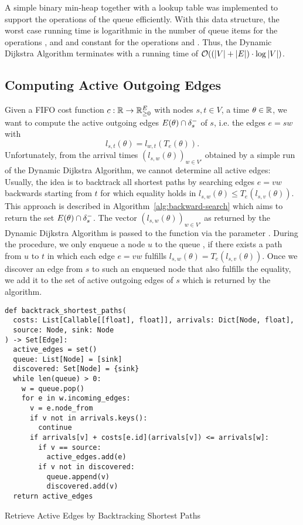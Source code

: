 A simple binary min-heap together with a lookup table was implemented to support the operations of the queue efficiently.
With this data structure, the worst case running time is logarithmic in the number of queue items for the operations ,  and  and constant for the operations  and .
Thus, the Dynamic Dijkstra Algorithm terminates with a running time of $\mathcal{O}( (\left| V \right| + \left| E \right|) \cdot \log \left| V \right|)$.


\subsection{Computing Active Outgoing Edges}\label{sec:compute-active-edges}

Given a FIFO cost function $c: \mathbb{R}\rightarrow\mathbb{R}_{\geq0}^E$ with nodes $s,t\in V$, a time $\theta\in\mathbb{R}$, we want to compute the active outgoing edges $E(\theta) \cap \delta^-_{s}$ of $s$, i.e. the edges $e=sw$ with 
\[
    l_{s,t}(\theta) = l_{w,t}(T_e(\theta)).
\]
Unfortunately, from the arrival times $(l_{s,w}(\theta))_{w\in V'}$ obtained by a simple run of the Dynamic Dijkstra Algorithm, we cannot determine all active edges:
Usually, the idea is to backtrack all shortest paths by searching edges $e=vw$ backwards starting from $t$ for which equality holds in $l_{s,w}(\theta) \leq T_e(l_{s,v}(\theta))$.
This approach is described in Algorithm~\ref{alg:backward-search} which aims to return the set $E(\theta)\cap \delta^-_{s}$.
The vector $(l_{s,w}(\theta))_{w\in V'}$ as returned by the Dynamic Dijkstra Algorithm is passed to the function via the parameter .
During the procedure, we only enqueue a node $u$ to the queue , if there exists a path from $u$ to $t$ in which each edge $e=vw$ fulfills $l_{s,w}(\theta)= T_e(l_{s,v}(\theta))$.
Once we discover an edge from $s$ to such an enqueued node that also fulfills the equality, we add it to the set of active outgoing edges of $s$ which is returned by the algorithm.

\begin{algorithm}
    \begin{verbatim}
def backtrack_shortest_paths(
  costs: List[Callable[[float], float]], arrivals: Dict[Node, float],
  source: Node, sink: Node
) -> Set[Edge]:
  active_edges = set()
  queue: List[Node] = [sink]
  discovered: Set[Node] = {sink}
  while len(queue) > 0:
    w = queue.pop()
    for e in w.incoming_edges:
      v = e.node_from
      if v not in arrivals.keys():
        continue
      if arrivals[v] + costs[e.id](arrivals[v]) <= arrivals[w]:
        if v == source:
          active_edges.add(e)
        if v not in discovered:
          queue.append(v)
          discovered.add(v)
  return active_edges
    \end{verbatim}
    \caption{Retrieve Active Edges by Backtracking Shortest Paths}
    \label{alg:backward-search}
\end{algorithm}

